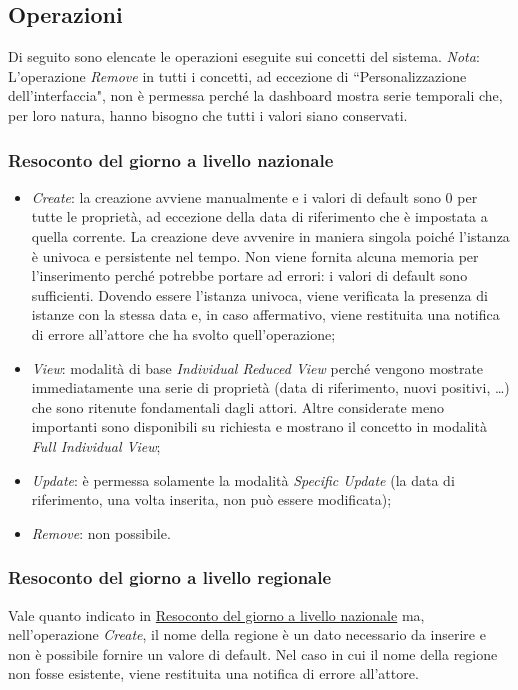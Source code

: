 \subsection{Operazioni}
\label{ss:operazioni}
Di seguito sono elencate le operazioni eseguite sui concetti del sistema.
\noindent
\textit{Nota}: L'operazione \textit{Remove} in tutti i concetti, ad eccezione di ``Personalizzazione dell'interfaccia", non è permessa perché la dashboard mostra serie temporali che, per loro natura, hanno bisogno che tutti i valori siano conservati.

\subsubsection{Resoconto del giorno a livello nazionale}
\label{sss:operazioni-resoconto-del-giorno-livello-nazionale}
\begin{itemize}
    \item \textit{Create}: la creazione avviene manualmente e i valori di default sono 0 per tutte le proprietà, ad eccezione della data di riferimento che è impostata a quella corrente.
    La creazione deve avvenire in maniera singola poiché l'istanza è univoca e persistente nel tempo.
    Non viene fornita alcuna memoria per l'inserimento perché potrebbe portare ad errori: i valori di default sono sufficienti.
    Dovendo essere l'istanza univoca, viene verificata la presenza di istanze con la stessa data e, in caso affermativo, viene restituita una notifica di errore all'attore che ha svolto quell'operazione;
    \item \textit{View}: modalità di base \textit{Individual Reduced View} perché vengono mostrate immediatamente una serie di proprietà (data di riferimento, nuovi positivi, \dots) che sono ritenute fondamentali dagli attori.
    Altre considerate meno importanti sono disponibili su richiesta e mostrano il concetto in modalità \textit{Full Individual View};
    \item \textit{Update}: è permessa solamente la modalità \textit{Specific Update} (la data di riferimento, una volta inserita, non può essere modificata);
    \item \textit{Remove}: non possibile.
\end{itemize}

\subsubsection{Resoconto del giorno a livello regionale}
\label{sss:operazioni-resoconto-del-giorno-livello-regionale}
Vale quanto indicato in \hyperref[sss:operazioni-resoconto-del-giorno-livello-nazionale]{Resoconto del giorno a livello nazionale} ma, nell'operazione \textit{Create}, il nome della regione è un dato necessario da inserire e non è possibile fornire un valore di default.
Nel caso in cui il nome della regione non fosse esistente, viene restituita una notifica di errore all'attore.

